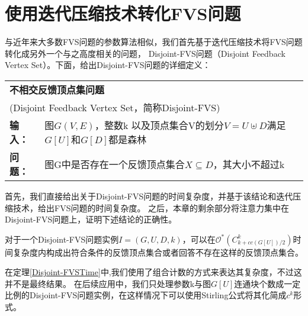 \section{使用迭代压缩技术转化FVS问题}
与近年来大多数FVS问题的参数算法相似，我们首先基于迭代压缩技术将FVS问题转化成另外一个与之高度相关的问题，
Disjoint-FVS问题（Disjoint Feedback Vertex Set）。下面，给出Disjoint-FVS问题的详细定义：\\

\begin{tabular}{ | p{0.06\headwidth} p{0.80\headwidth} | }
  \hline
  \multicolumn{2}{|l|}{ \textbf{不相交反馈顶点集问题} }\\
  \multicolumn{2}{|l|}{ (Disjoint Feedback Vertex Set，简称Disjoint-FVS)}\\
  \textbf{输入：} & 图$G(V, E)$，整数k 以及顶点集合V的划分$V = U \uplus D$满足$G[U]$和$G[D]$都是森林\\
  \textbf{问题：} & 图G中是否存在一个反馈顶点集合$X \subseteq D$，其大小不超过k\\
  \hline
\end{tabular} \vspace{0.5cm}

首先，我们直接给出关于Disjoint-FVS问题的时间复杂度，并基于该结论和迭代压缩技术，给出FVS问题的时间复杂度。
之后，本章的剩余部分将注意力集中在Disjoint-FVS问题上，证明下述结论的正确性。
\begin{theorem} \label{Disjoint-FVSTime}
  对于一个Disjoint-FVS问题实例$I = (G, U, D, k)$，可以在$\mathcal{O}^*(C^k_{k + cc(G[U])/2})$时间复杂度内构成出符合条件的反馈顶点集合或者回答不存在这样的反馈顶点集合。
\end{theorem}

在定理\ref{Disjoint-FVSTime}中,我们使用了组合计数的方式来表达其复杂度，不过这并不是最终结果。
在后续应用中，我们只处理参数k与图$G[U]$连通块个数成一定比例的Disjoint-FVS问题实例，在这样情况下可以使用Stirling公式将其化简成$c^k$形式。

